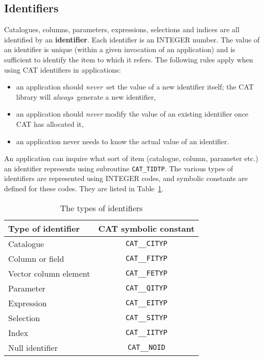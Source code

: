 \documentclass[11pt,twoside]{starlink}
\begin{document}
\subsection{Identifiers}

Catalogues, columns, parameters, expressions, selections and indices are
all identified by an \textbf{identifier}. Each identifier is an INTEGER
number. The value of an identifier is unique (within a given invocation of
an application) and is sufficient to identify the item to which it refers.
The following rules apply when using CAT identifiers in applications:

\begin{itemize}

  \item an application should \textit{never}\, set the value of a new
   identifier itself; the CAT library will \textit{always}\, generate a
   new identifier,

  \item an application should \textit{never} modify the value of an
   existing identifier once CAT has allocated it,

  \item an application never needs to know the actual value of an
   identifier.

\end{itemize}

An application can inquire what sort of item (catalogue, column,
parameter etc.) an identifier represents using subroutine \texttt{CAT\_TIDTP}. The various types of identifiers are represented using
INTEGER codes, and symbolic constants are defined for these codes. They
are listed in Table~\ref{IDTYPE}.

\begin{table}[htbp]

\begin{center}
\begin{tabular}{lc}
Type of identifier        &  CAT symbolic constant \\ \hline
Catalogue                 &  \texttt{CAT\_\_CITYP}   \\
Column or field           &  \texttt{CAT\_\_FITYP}   \\
Vector column element     &  \texttt{CAT\_\_FETYP}   \\
Parameter                 &  \texttt{CAT\_\_QITYP}   \\
Expression                &  \texttt{CAT\_\_EITYP}   \\
Selection                 &  \texttt{CAT\_\_SITYP}   \\
Index                     &  \texttt{CAT\_\_IITYP}   \\
Null identifier           &  \texttt{CAT\_\_NOID}   \\
\end{tabular}
\end{center}

\caption{\label{IDTYPE}The types of identifiers}

\end{table}
\end{document}
